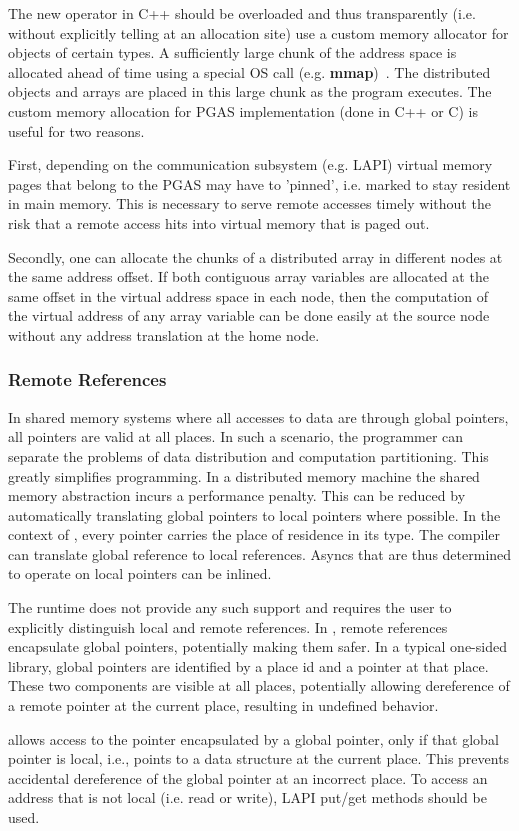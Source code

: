 The new operator in C++ should be overloaded and thus transparently
(i.e. without explicitly telling at an allocation site) use a custom
memory allocator for objects of certain types. 
A sufficiently large chunk of the address space is allocated ahead of time 
using a special OS call (e.g. {\bf mmap})~\cite{gasnet}. The distributed objects and arrays 
are placed in this large chunk as the program executes.  
The custom memory allocation for PGAS implementation (done in C++ or
C) is useful for two reasons.

First, depending on the communication subsystem (e.g. LAPI) virtual
memory pages that belong to the PGAS may have to 'pinned', i.e. marked
to stay resident in main memory. This is necessary to serve remote
accesses timely without the risk that a remote access hits into
virtual memory that is paged out. 

Secondly, one can allocate the chunks of a distributed array in
different nodes at the same address offset. If both contiguous array
variables are allocated at the same offset in the virtual address
space in each node, then the computation of the virtual address of any
array variable can be done easily at the source node without any address
translation at the home node.

\subsubsection {Remote References}

In shared memory systems where all accesses to data are through global
pointers, all pointers are valid at all places. In such a scenario,
the programmer can separate the problems of data distribution and
computation partitioning. This greatly simplifies programming. In a
distributed memory machine the shared memory abstraction incurs a
performance penalty. This can be reduced by automatically translating
global pointers to local pointers where possible.  In the context of
\Xten, every pointer carries the place of residence in its type. The
compiler can translate global reference to local references. Asyncs
that are thus determined to operate on local pointers can be inlined.

The runtime does not provide any such support and requires the user to
explicitly distinguish local and remote references. In \Xtenlib, remote
references encapsulate global pointers, potentially making them
safer. In a typical one-sided library, global pointers are identified
by a place id and a pointer at that place. These two components are
visible at all places, potentially allowing dereference of a remote
pointer at the current place, resulting in undefined behavior.

\Xtenlib{} allows access to the pointer encapsulated by a global pointer,
only if that global pointer is local, i.e., points to a data structure
at the current place. This prevents accidental dereference of the
global pointer at an incorrect place. To access an address that is not
local (i.e. read or write), LAPI put/get methods should be used. 